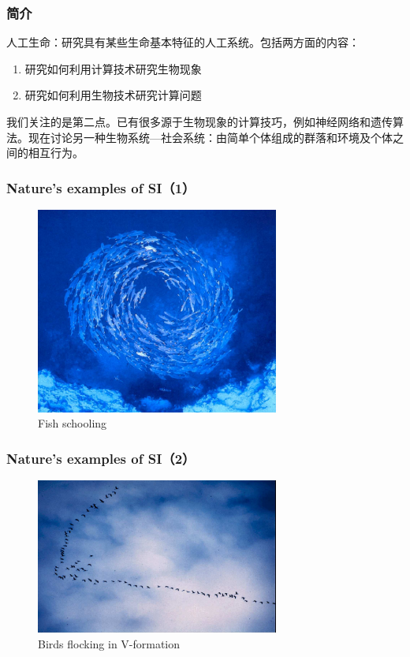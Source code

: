 \begin{frame}
  \frametitle{简介}
  人工生命：研究具有某些生命基本特征的人工系统。包括两方面的内容：
	 \begin{enumerate}
	    \item{研究如何利用计算技术研究生物现象}
	    \item{研究如何利用生物技术研究计算问题}
	  \end{enumerate}
    我们关注的是第二点。已有很多源于生物现象的计算技巧，例如神经网络和遗传算法。现在讨论另一种生物系统---社会系统：由简单个体组成的群落和环境及个体之间的相互行为。
\end{frame}


\begin{frame}
  \frametitle{Nature’s examples of SI（1）}
    \begin{figure}[htbp]
      \centering
      \includegraphics[width=8cm]{pic/si1.png}
      \caption{Fish schooling}
    \end{figure}
\end{frame}

\begin{frame}
  \frametitle{Nature’s examples of SI（2）}
    \begin{figure}[htbp]
      \centering
      \includegraphics[width=8cm]{pic/si2.png}
      \caption{Birds flocking in V-formation}
    \end{figure}
\end{frame}

